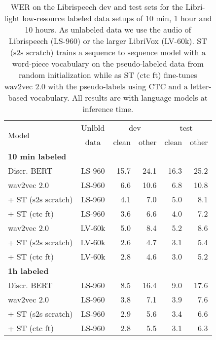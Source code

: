 \documentclass{article}
\newcommand{\wvpp}{wav2vec 2.0}
\newcommand{\vox}{LibriVox}
\newcommand{\libri}{Librispeech}
\newcommand{\libril}{Libri-light}
\newcommand{\voxsz}{LV-60k}
\newcommand{\librisz}{LS-960}
\begin{document}
\begin{table}[t]
\centering
\caption{WER on the \libri{} dev and test sets for the \libril{} low-resource labeled data setups of 10 min, 1 hour and 10 hours. 
As unlabeled data we use the audio of \libri{} (\librisz{}) or the larger \vox{} (\voxsz{}).
ST (s2s scratch) trains a sequence to sequence model with a word-piece vocabulary on the pseudo-labeled data from random initialization while as ST (ctc ft) fine-tunes \wvpp{} with the pseudo-labels using CTC and a letter-based vocabulary.
All results are with language models at inference time.
}
\label{tab:lowres}
\begin{tabular}{lcrrrr}
\toprule
\multirow{2}{*}{Model} & Unlbld & \multicolumn{2}{c}{dev} & \multicolumn{2}{c}{test} \\
\cline{3-4}\cline{5-6} 
{} & data & clean & other & clean & other \\
\midrule
\midrule
\multicolumn{6}{l}{\textbf{10 min labeled}} \\
Discr. BERT~\cite{baevski2019effectiveness} & \librisz{} & 15.7 & 24.1 & 16.3 & 25.2 \\
\wvpp{}~\cite{baevski2020wav} & \librisz{} & 6.6 & 10.6 & 6.8 & 10.8 \\
\hspace{0.04in}+ ST (s2s scratch) & \librisz{} & 4.1	& 7.0	& 5.0	& 8.1  \\
\hspace{0.04in}+ ST (ctc ft) & \librisz{} & 3.6 & 6.6 & 4.0 & 7.2 \\
\midrule 
\wvpp{}~\cite{baevski2020wav}& \voxsz{} & 5.0 & 8.4 & 5.2 & 8.6 \\
\hspace{0.04in}+ ST (s2s scratch) & \voxsz{} & 2.6 & 4.7 & 3.1 & 5.4  \\
\hspace{0.04in}+ ST (ctc ft) & \voxsz{} & 2.8 & 4.6 & 3.0 & 5.2 \\
\midrule
\midrule
\multicolumn{6}{l}{\textbf{1h labeled}} \\
Discr. BERT~\cite{baevski2019effectiveness} & \librisz{} & 8.5 & 16.4 & 9.0 & 17.6 \\
\wvpp{}~\cite{baevski2020wav} & \librisz{} &  3.8 & 7.1 & 3.9 & 7.6 \\
\hspace{0.04in}+ ST (s2s scratch)  & \librisz{} & 2.9	& 5.6	& 3.4	& 6.6 \\
\hspace{0.04in}+ ST (ctc ft) & \librisz{} & 2.8 & 5.5 & 3.1 & 6.3 \\

\end{tabular}
\end{table}
\end{document}
